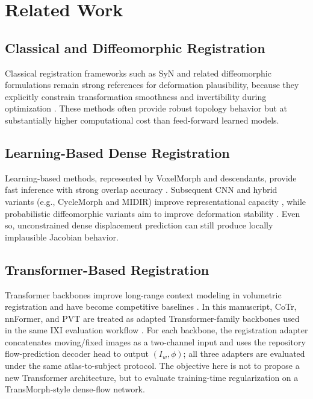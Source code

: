 \documentclass[jimaging,article,submit,pdftex,moreauthors]{Definitions/mdpi}
\begin{document}
\section{Related Work}

\subsection{Classical and Diffeomorphic Registration}
Classical registration frameworks such as SyN and related diffeomorphic formulations remain strong references for deformation plausibility, because they explicitly constrain transformation smoothness and invertibility during optimization \cite{avants2008ants,rueckert1999nonrigid,ashburner1999morphometry}. These methods often provide robust topology behavior but at substantially higher computational cost than feed-forward learned models.

\subsection{Learning-Based Dense Registration}
Learning-based methods, represented by VoxelMorph and descendants, provide fast inference with strong overlap accuracy \cite{balakrishnan2019voxelmorph}. Subsequent CNN and hybrid variants (e.g., CycleMorph and MIDIR) improve representational capacity \cite{kim2021cyclemorph}, while probabilistic diffeomorphic variants aim to improve deformation stability \cite{dalca2019probreg}. Even so, unconstrained dense displacement prediction can still produce locally implausible Jacobian behavior.

\subsection{Transformer-Based Registration}
Transformer backbones improve long-range context modeling in volumetric registration and have become competitive baselines \cite{chen2022transmorph,liu2021swin}. In this manuscript, CoTr, nnFormer, and PVT are treated as adapted Transformer-family backbones used in the same IXI evaluation workflow \cite{xie2021cotr,zhou2023nnformer,wang2021pvt}. For each backbone, the registration adapter concatenates moving/fixed images as a two-channel input and uses the repository flow-prediction decoder head to output \((I_w,\phi)\); all three adapters are evaluated under the same atlas-to-subject protocol. The objective here is not to propose a new Transformer architecture, but to evaluate training-time regularization on a TransMorph-style dense-flow network.
\end{document}
